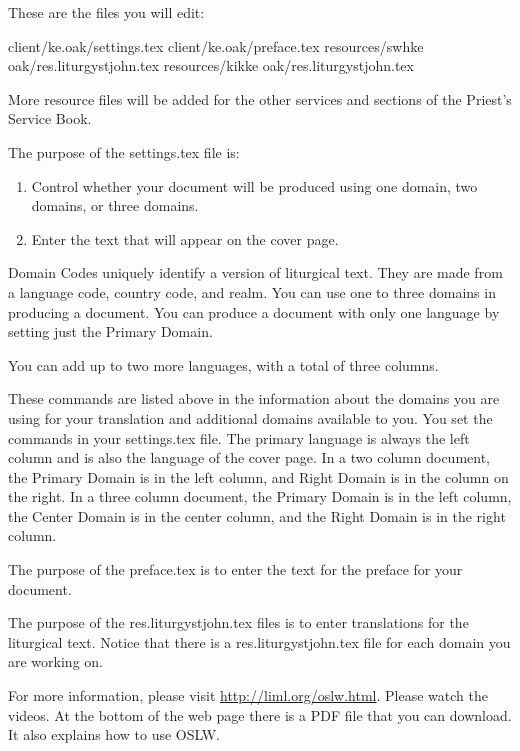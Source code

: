 \documentclass[]{memoir}
\begin{document}
These are the files you will edit:

\pex

\a client/ke.oak/settings.tex
\a client/ke.oak/preface.tex
\a resources/swh\textunderscore ke \textunderscore oak/res.liturgystjohn.tex
\a resources/kik\textunderscore ke \textunderscore oak/res.liturgystjohn.tex
\xe

More resource files will be added for the other services and sections of the Priest's Service Book.

The purpose of the settings.tex file is:
\begin{enumerate}
\item Control whether your document will be produced using one domain, two domains, or three domains.
\item Enter the text that will appear on the cover page.
\end{enumerate}

Domain Codes uniquely identify a version of liturgical text. They are made from a language code, country code, and realm. You can use one to three domains in producing a document. You can produce a document with only one language by setting just the Primary Domain. 

You can add up to two more languages, with a total of three columns. 

These commands are listed above in the information about the domains you are using for your translation and additional domains available to you. You set the commands in your settings.tex file. The primary language is always the left column and is also the language of the cover page.  In a two column document, the Primary Domain is in the left column, and Right Domain is in the column on the right.  In a three column document, the Primary Domain is in the left column, the Center Domain is in the center column, and the Right Domain is in the right column.

The purpose of the preface.tex is to enter the text for the preface for your document.

The purpose of the res.liturgystjohn.tex files is to enter translations for the liturgical text.  Notice that there is a res.liturgystjohn.tex file for each domain you are working on.

\bigskip
For more information, please visit \url{http://liml.org/oslw.html}. Please watch the videos.  At the bottom of the web page there is a PDF file that you can download.  It also explains how to use OSLW.

 
\end{document}
